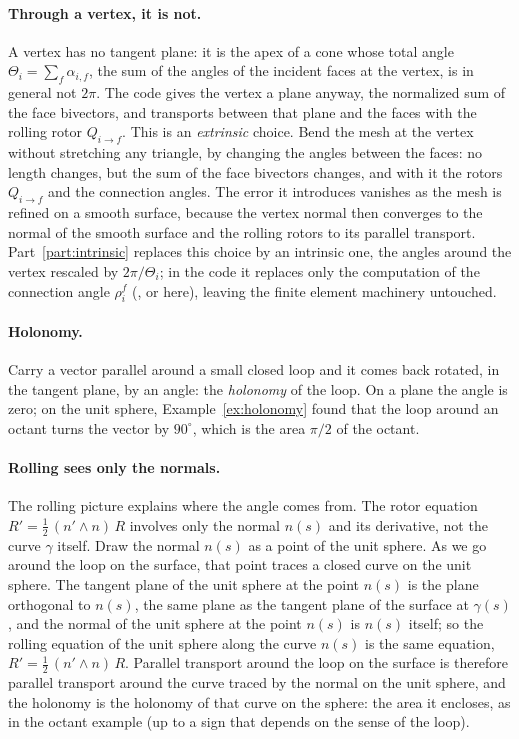\paragraph{Through a vertex, it is not.} A vertex has no tangent plane: it is the apex of a cone whose total angle $\Theta_i = \sum_f \alpha_{i,f}$, the sum of the angles of the incident faces at the vertex, is in general not $2\pi$. The code gives the vertex a plane anyway, the normalized sum of the face bivectors, and transports between that plane and the faces with the rolling rotor $Q_{i \to f}$. This is an \emph{extrinsic} choice. Bend the mesh at the vertex without stretching any triangle, by changing the angles between the faces: no length changes, but the sum of the face bivectors changes, and with it the rotors $Q_{i\to f}$ and the connection angles. The error it introduces vanishes as the mesh is refined on a smooth surface, because the vertex normal then converges to the normal of the smooth surface and the rolling rotors to its parallel transport. Part~\ref{part:intrinsic} replaces this choice by an intrinsic one, the angles around the vertex rescaled by $2\pi/\Theta_i$; in the code it replaces only the computation of the connection angle $\rho_i^f$ (, or  here), leaving the finite element machinery untouched.

\paragraph{Holonomy.} Carry a vector parallel around a small closed loop and it comes back rotated, in the tangent plane, by an angle: the \emph{holonomy} of the loop. On a plane the angle is zero; on the unit sphere, Example~\ref{ex:holonomy} found that the loop around an octant turns the vector by $90^\circ$, which is the area $\pi/2$ of the octant.

\paragraph{Rolling sees only the normals.} The rolling picture explains where the angle comes from. The rotor equation $R' = \frac12\,(n'\wedge n)\,R$ involves only the normal $n(s)$ and its derivative, not the curve $\gamma$ itself. Draw the normal $n(s)$ as a point of the unit sphere. As we go around the loop on the surface, that point traces a closed curve on the unit sphere. The tangent plane of the unit sphere at the point $n(s)$ is the plane orthogonal to $n(s)$, the same plane as the tangent plane of the surface at $\gamma(s)$, and the normal of the unit sphere at the point $n(s)$ is $n(s)$ itself; so the rolling equation of the unit sphere along the curve $n(s)$ is the same equation, $R' = \frac12\,(n'\wedge n)\,R$. Parallel transport around the loop on the surface is therefore parallel transport around the curve traced by the normal on the unit sphere, and the holonomy is the holonomy of that curve on the sphere: the area it encloses, as in the octant example (up to a sign that depends on the sense of the loop).

